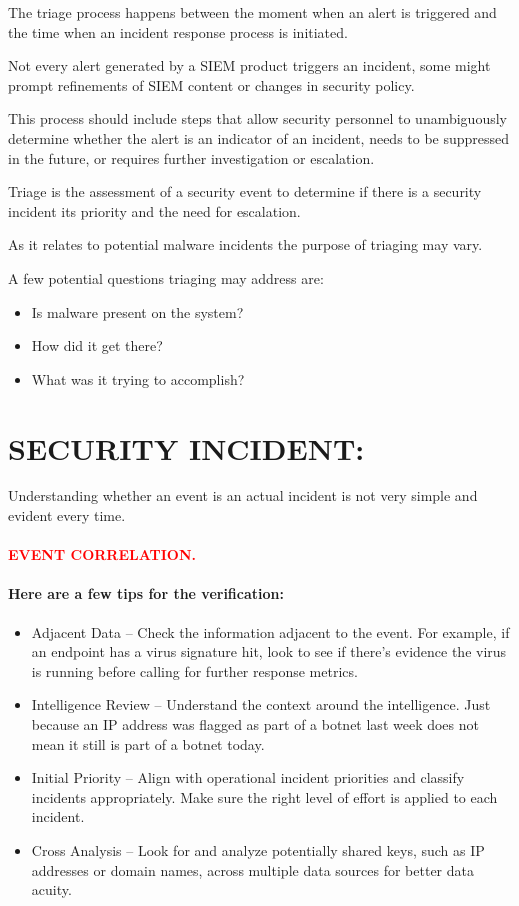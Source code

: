 \documentclass[10pt,british,english]{article}
\begin{document}
The triage process happens between the moment when an alert is triggered
and the time when an incident response process is initiated. 

Not every alert generated by a SIEM product triggers an incident,
some might prompt refinements of SIEM content or changes in security
policy. 

This process should include steps that allow security personnel to
unambiguously determine whether the alert is an indicator of an incident,
needs to be suppressed in the future, or requires further investigation
or escalation.

Triage is the assessment of a security event to determine if there
is a security incident its priority and the need for escalation.

As it relates to potential malware incidents the purpose of triaging
may vary. 

A few potential questions triaging may address are:
\begin{itemize}
\item Is malware present on the system?
\item How did it get there?
\item What was it trying to accomplish?
\end{itemize}

\section{SECURITY INCIDENT:}

Understanding whether an event is an actual incident is not very simple
and evident every time. 

\paragraph{\textcolor{red}{EVENT CORRELATION. }}

\paragraph*{Here are a few tips for the verification:}
\begin{itemize}
\item Adjacent Data -- Check the information adjacent to the event. For
example, if an endpoint has a virus signature hit, look to see if
there\textquoteright s evidence the virus is running before calling
for further response metrics.
\item Intelligence Review -- Understand the context around the intelligence.
Just because an IP address was flagged as part of a botnet last week
does not mean it still is part of a botnet today.
\item Initial Priority -- Align with operational incident priorities and
classify incidents appropriately. Make sure the right level of effort
is applied to each incident.
\item Cross Analysis -- Look for and analyze potentially shared keys, such
as IP addresses or domain names, across multiple data sources for
better data acuity.
\end{itemize}
\end{document}
